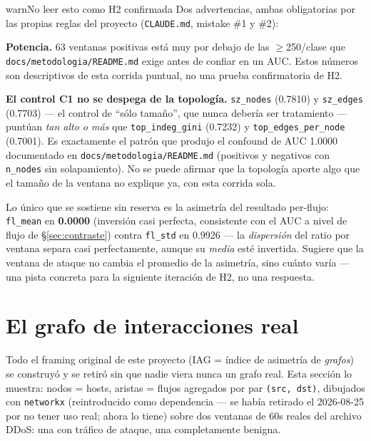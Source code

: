 \documentclass[11pt]{article}
\newcommand{\code}[1]{\texttt{\small #1}}
\begin{document}
\begin{cbox}{warn}{No leer esto como H2 confirmada}
Dos advertencias, ambas obligatorias por las propias reglas del proyecto
(\code{CLAUDE.md}, mistake \#1 y \#2):

\textbf{Potencia.} 63 ventanas positivas está muy por debajo de las $\geq$250/clase que
\code{docs/metodologia/README.md} exige antes de confiar en un AUC. Estos números son
descriptivos de esta corrida puntual, no una prueba confirmatoria de H2.

\textbf{El control C1 no se despega de la topología.} \code{sz\_nodes} (0.7810) y
\code{sz\_edges} (0.7703) --- el control de ``sólo tamaño'', que nunca debería ser
tratamiento --- puntúan \emph{tan alto o más} que \code{top\_indeg\_gini} (0.7232) y
\code{top\_edges\_per\_node} (0.7001). Es exactamente el patrón que produjo el confound de
AUC 1.0000 documentado en \code{docs/metodologia/README.md} (positivos y negativos con
\code{n\_nodes} sin solapamiento). No se puede afirmar que la topología aporte algo que el
tamaño de la ventana no explique ya, con esta corrida sola.

Lo único que se sostiene sin reserva es la asimetría del resultado per-flujo:
\code{fl\_mean} en \textbf{0.0000} (inversión casi perfecta, consistente con el AUC a nivel
de flujo de \S\ref{sec:contraste}) contra \code{fl\_std} en 0.9926 --- la \emph{dispersión}
del ratio por ventana separa casi perfectamente, aunque su \emph{media} esté invertida.
Sugiere que la ventana de ataque no cambia el promedio de la asimetría, sino cuánto varía
--- una pista concreta para la siguiente iteración de H2, no una respuesta.
\end{cbox}

\section{El grafo de interacciones real}
\label{sec:grafo}

Todo el framing original de este proyecto (IAG = índice de asimetría de \emph{grafos}) se
construyó y se retiró sin que nadie viera nunca un grafo real. Esta sección lo muestra:
nodos = hosts, aristas = flujos agregados por par \code{(src, dst)}, dibujados con
\code{networkx} (reintroducido como dependencia --- se había retirado el 2026-08-25 por no
tener uso real; ahora lo tiene) sobre dos ventanas de 60s reales del archivo DDoS: una con
tráfico de ataque, una completamente benigna.
\end{document}
